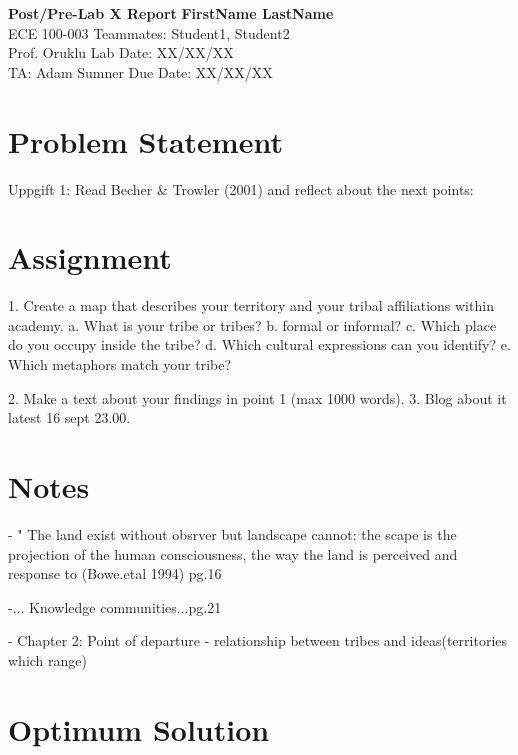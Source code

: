 \documentclass[a4paper, 11pt]{article}
\begin{document}
\noindent
\large\textbf{Post/Pre-Lab X Report} \hfill \textbf{FirstName LastName} \\
\normalsize ECE 100-003 \hfill Teammates: Student1, Student2 \\
Prof. Oruklu \hfill Lab Date: XX/XX/XX \\
TA: Adam Sumner \hfill Due Date: XX/XX/XX

\section*{Problem Statement}
Uppgift 1: Read Becher \& Trowler (2001) and reflect about the next points:

\section*{Assignment}
1. Create a map that describes your territory and your tribal affiliations within academy.
	a. What is your tribe or tribes?
	b. formal or informal?
	c. Which place do you occupy inside the tribe?
	d. Which cultural expressions can you identify?
	e. Which metaphors match your tribe?
	
2. Make a text about your findings in point 1 (max 1000 words).
3. Blog about it latest 16 sept 23.00.


\section*{Notes}
- " The land exist without obsrver but landscape cannot: the scape is the projection of the human consciousness, the way the land is perceived and response to (Bowe.etal 1994) pg.16

-... Knowledge communities...pg.21

- Chapter 2: Point of departure
	- relationship between tribes and ideas(territories which range)


\section*{Optimum Solution}
\lipsum[4]
\end{document}
